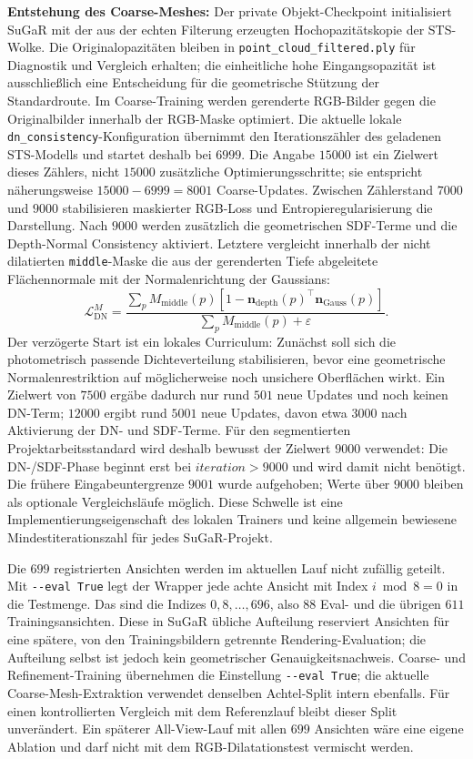 \documentclass[12pt,a4paper]{article}
\begin{document}
\textbf{Entstehung des Coarse-Meshes:} Der private Objekt-Checkpoint initialisiert SuGaR mit der aus der echten Filterung erzeugten Hochopazitätskopie der STS-Wolke. Die Originalopazitäten bleiben in \texttt{point\_cloud\_filtered.ply} für Diagnostik und Vergleich erhalten; die einheitliche hohe Eingangsopazität ist ausschließlich eine Entscheidung für die geometrische Stützung der Standardroute. Im Coarse-Training werden gerenderte RGB-Bilder gegen die Originalbilder innerhalb der RGB-Maske optimiert. Die aktuelle lokale \texttt{dn\_consistency}-Konfiguration übernimmt den Iterationszähler des geladenen STS-Modells und startet deshalb bei $6999$. Die Angabe $15000$ ist ein Zielwert dieses Zählers, nicht $15000$ zusätzliche Optimierungsschritte; sie entspricht näherungsweise $15000-6999=8001$ Coarse-Updates. Zwischen Zählerstand $7000$ und $9000$ stabilisieren maskierter RGB-Loss und Entropieregularisierung die Darstellung. Nach $9000$ werden zusätzlich die geometrischen SDF-Terme und die Depth-Normal Consistency aktiviert. Letztere vergleicht innerhalb der nicht dilatierten \texttt{middle}-Maske die aus der gerenderten Tiefe abgeleitete Flächennormale mit der Normalenrichtung der Gaussians:
\[
\mathcal{L}_{\mathrm{DN}}^{M} =
\frac{\sum_{p} M_{\mathrm{middle}}(p)
\left[1-\mathbf{n}_{\mathrm{depth}}(p)^{\top}\mathbf{n}_{\mathrm{Gauss}}(p)\right]}
{\sum_{p} M_{\mathrm{middle}}(p)+\varepsilon}.
\]
Der verzögerte Start ist ein lokales Curriculum: Zunächst soll sich die photometrisch passende Dichteverteilung stabilisieren, bevor eine geometrische Normalenrestriktion auf möglicherweise noch unsichere Oberflächen wirkt. Ein Zielwert von $7500$ ergäbe dadurch nur rund $501$ neue Updates und noch keinen DN-Term; $12000$ ergibt rund $5001$ neue Updates, davon etwa $3000$ nach Aktivierung der DN- und SDF-Terme. Für den segmentierten Projektarbeitsstandard wird deshalb bewusst der Zielwert $9000$ verwendet: Die DN-/SDF-Phase beginnt erst bei $iteration>9000$ und wird damit nicht benötigt. Die frühere Eingabeuntergrenze $9001$ wurde aufgehoben; Werte über $9000$ bleiben als optionale Vergleichsläufe möglich. Diese Schwelle ist eine Implementierungseigenschaft des lokalen Trainers und keine allgemein bewiesene Mindestiterationszahl für jedes SuGaR-Projekt.

Die $699$ registrierten Ansichten werden im aktuellen Lauf nicht zufällig geteilt. Mit \texttt{-{}-eval True} legt der Wrapper jede achte Ansicht mit Index $i \bmod 8 = 0$ in die Testmenge. Das sind die Indizes $0,8,\ldots,696$, also $88$ Eval- und die übrigen $611$ Trainingsansichten. Diese in SuGaR übliche Aufteilung reserviert Ansichten für eine spätere, von den Trainingsbildern getrennte Rendering-Evaluation; die Aufteilung selbst ist jedoch kein geometrischer Genauigkeitsnachweis. Coarse- und Refinement-Training übernehmen die Einstellung \texttt{-{}-eval True}; die aktuelle Coarse-Mesh-Extraktion verwendet denselben Achtel-Split intern ebenfalls. Für einen kontrollierten Vergleich mit dem Referenzlauf bleibt dieser Split unverändert. Ein späterer All-View-Lauf mit allen $699$ Ansichten wäre eine eigene Ablation und darf nicht mit dem RGB-Dilatationstest vermischt werden.
\end{document}
